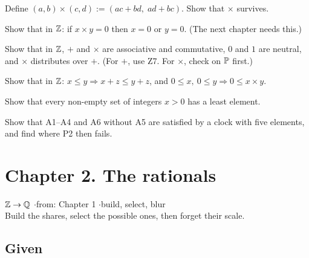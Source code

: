 \begin{lines}
\item[\lab{E1}] Define $(a,b) \times (c,d) := (ac + bd,\; ad + bc)$. Show that $\times$ survives.
\item[\lab{E2}] Show that in $\mathbb{Z}$: if $x \times y = 0$ then $x = 0$ or $y = 0$. (The next chapter needs this.)
\item[\lab{E3}] Show that in $\mathbb{Z}$, $+$ and $\times$ are associative and commutative, $0$ and $1$ are neutral, and $\times$ distributes over $+$. (For $+$, use Z7. For $\times$, check on $\mathbb{P}$ first.)
\item[\lab{E4}] Show that in $\mathbb{Z}$: $x \le y \Rightarrow x + z \le y + z$, and $0 \le x,\ 0 \le y \Rightarrow 0 \le x \times y$.
\item[\lab{E5}] Show that every non-empty set of integers $x > 0$ has a least element.
\item[\lab{E6}] Show that A1--A4 and A6 without A5 are satisfied by a clock with five elements, and find where P2 then fails.
\end{lines}

\newpage

\section*{Chapter 2. The rationals}
\begin{center}
{\normalsize $\mathbb{Z} \to \mathbb{Q}$ \quad$\cdot$\quad from: Chapter 1 \quad$\cdot$\quad build, select, blur}\\[4pt]
{\small Build the shares, select the possible ones, then forget their scale.}
\end{center}

\subsection*{Given}

